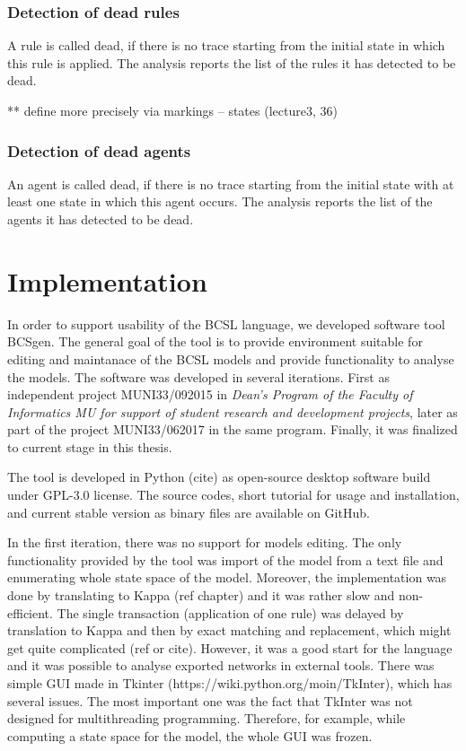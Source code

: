 \documentclass[12pt]{fithesis2}
\begin{document}
\subsection{Detection of dead rules}

A rule is called dead, if there is no trace starting from the initial state in which this rule is applied. The analysis reports the list of the rules it has detected to be dead. 

** define more precisely via markings -- states (lecture3, 36)

\subsection{Detection of dead agents}

An agent is called dead, if there is no trace starting from the initial state with at least one state in which this agent occurs. The analysis reports the list of the agents it has detected to be dead.

\chapter{Implementation}

In order to support usability of the BCSL language, we developed software tool BCSgen. The general goal of the tool is to provide environment suitable for editing and maintanace of the BCSL models and provide functionality to analyse the models. The software was developed in several iterations. First as independent project MUNI33/092015 in \emph{Dean's Program of the Faculty of Informatics MU for support of student research and development projects}, later as part of the project MUNI33/062017 in the same program. Finally, it was finalized to current stage in this thesis.

The tool is developed in Python (cite) as open-source desktop software build under GPL-3.0 license. The source codes, short tutorial for usage and installation, and current stable version as binary files are available on GitHub\footnotemark[1].

In the first iteration, there was no support for models editing. The only functionality provided by the tool was import of the model from a text file and enumerating whole state space of the model. Moreover, the implementation was done by translating to Kappa (ref chapter) and it was rather slow and non-efficient. The single transaction (application of one rule) was delayed by translation to Kappa and then by exact matching and replacement, which might get quite complicated (ref or cite). However, it was a good start for the language and it was possible to analyse exported networks in external tools. There was simple GUI made in Tkinter (https://wiki.python.org/moin/TkInter), which has several issues. The most important one was the fact that TkInter was not designed for multithreading programming. Therefore, for example, while computing a state space for the model, the whole GUI was frozen.
\end{document}
